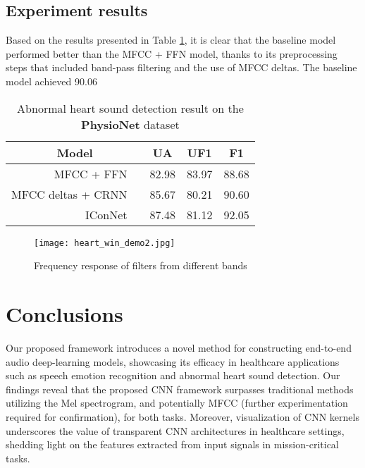 {\subsection{Experiment results}
Based on the results presented in Table \ref{tab:result_heartsound}, it is clear that the baseline model \cite{deng2020heart} performed better than the MFCC + FFN model, thanks to its preprocessing steps that included band-pass filtering and the use of MFCC deltas. The baseline model achieved 90.06\

\begin{table}[th]
  \caption{Abnormal heart sound detection result on the \textbf{PhysioNet} dataset}
  \label{tab:result_heartsound}
  \centering
  \begin{tabular}{ r@{}l c c c}
    \toprule
    \multicolumn{2}{c}{\textbf{Model}} & 
    \multicolumn{1}{c}{\textbf{UA}} & 
    \multicolumn{1}{c}{\textbf{UF1}} & 
    \multicolumn{1}{c}{\textbf{F1}} \\
    \midrule
    MFCC + FFN & & 82.98 & 83.97 & 88.68 \\
    MFCC deltas + CRNN \cite{deng2020heart} & & 85.67 & 80.21 & 90.60 \\
    IConNet & & 87.48 & 81.12 & 92.05 \\
    \bottomrule
  \end{tabular}
\end{table}

\begin{figure}[t]
\texttt{[image: heart\_win\_demo2.jpg]}
\caption{Frequency response of filters from different bands}
\label{fig:heart_win}
\end{figure}





\section{Conclusions}
\label{sec:conclusions}

Our proposed framework introduces a novel method for constructing end-to-end audio deep-learning models, showcasing its efficacy in healthcare applications such as speech emotion recognition and abnormal heart sound detection. Our findings reveal that the proposed CNN framework surpasses traditional methods utilizing the Mel spectrogram, and potentially MFCC (further experimentation required for confirmation), for both tasks. Moreover, visualization of CNN kernels underscores the value of transparent CNN architectures in healthcare settings, shedding light on the features extracted from input signals in mission-critical tasks.

}
